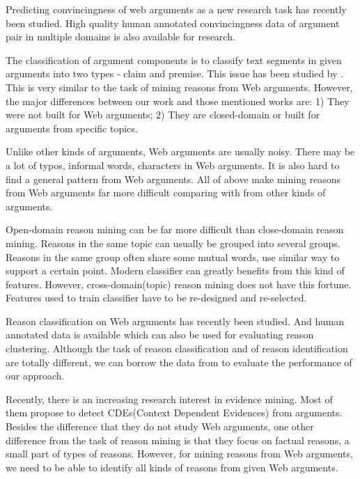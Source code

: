 \documentclass[11pt,a4paper]{article}
\begin{document}
Predicting convincingness of web arguments as a new research task has recently been studied\cite{habernal2016argument}. High quality human annotated convincingness data of argument pair in multiple domains is also available for research\cite{habernal2016argument}. 

The classification of argument components is to classify text segments in given arguments into two types - claim and premise\cite{stab2014argumentation}. This issue has been studied by \cite{rooney2012applying,feng2011classifying,palau2009argumentation,mochales2011argumentation}. This is very similar to the task of mining reasons from Web arguments. However, the major differences between our work and those mentioned works are: 1) They were not built for Web arguments; 2) They are closed-domain or built for arguments from specific topics.

Unlike other kinds of arguments, Web arguments are usually noisy\cite{habernal2016argument}. There may be a lot of typos, informal words, characters in Web arguments. It is also hard to find a general pattern from Web arguments. All of above make mining reasons from Web arguments far more difficult comparing with from other kinds of arguments.

Open-domain reason mining can be far more difficult than close-domain reason mining. Reasons in the same topic can usually be grouped into several groups\cite{hasan2014you}. Reasons in the same group often share some mutual words, use similar way to support a certain point. Modern classifier can greatly benefits from this kind of features. However, cross-domain(topic) reason mining does not have this fortune. Features used to train classifier have to be re-designed and re-selected. 

Reason classification on Web arguments has recently been studied\cite{hasan2014you}. And human annotated data is available which can also be used for evaluating reason clustering. Although the task of reason classification and of reason identification are totally different, we can borrow the data from \cite{hasan2014you} to evaluate the performance of our approach. 

Recently, there is an increasing research interest in evidence mining\cite{cartright2011evidence, rinott2015show, aharoni2014benchmark}. Most of them propose to detect CDEs(Context Dependent Evidences) from arguments. Besides the difference that they do not study Web arguments, one other difference from the task of reason mining is that they focus on factual reasons, a small part of types of reasons. However, for mining reasons from Web arguments, we need to be able to identify all kinds of reasons from given Web arguments.  
\end{document}
